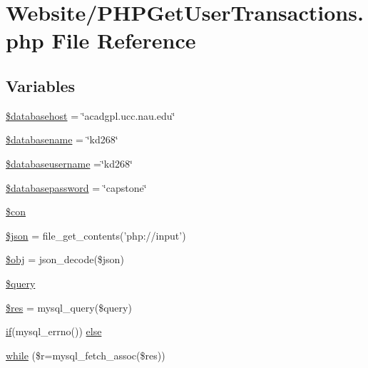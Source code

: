 \hypertarget{_p_h_p_get_user_transactions_8php}{\section{Website/\-P\-H\-P\-Get\-User\-Transactions.php File Reference}
\label{_p_h_p_get_user_transactions_8php}
}
\subsection*{Variables}
\begin{DoxyCompactItemize}
\item 
\hyperlink{_p_h_p_get_user_transactions_8php_a034ead57b6864a4413371711e8d65372}{\$databasehost} = \char`\"{}acadgpl.\-ucc.\-nau.\-edu\char`\"{}
\item 
\hyperlink{_p_h_p_get_user_transactions_8php_aace53f8afce81b52040cef0cd850138a}{\$databasename} = \char`\"{}kd268\char`\"{}
\item 
\hyperlink{_p_h_p_get_user_transactions_8php_a251bf75f510d7c8b556c65d7c30e911f}{\$databaseusername} =\char`\"{}kd268\char`\"{}
\item 
\hyperlink{_p_h_p_get_user_transactions_8php_a1a07536b6a5f43f2d8f826bd2ee6c91a}{\$databasepassword} = \char`\"{}capstone\char`\"{}
\item 
\hyperlink{_p_h_p_get_user_transactions_8php_a0debe10448ec56a57b5509648408a549}{\$con}
\item 
\hyperlink{_p_h_p_get_user_transactions_8php_acedd13b51401130848ce18f4d5c52605}{\$json} = file\-\_\-get\-\_\-contents('php\-://input')
\item 
\hyperlink{_p_h_p_get_user_transactions_8php_a9008ed94ba185855b1723e367744b87e}{\$obj} = json\-\_\-decode(\$json)
\item 
\hyperlink{_p_h_p_get_user_transactions_8php_af59a5f7cd609e592c41dc3643efd3c98}{\$query}
\item 
\hyperlink{_p_h_p_get_user_transactions_8php_a49a8a4009b02e49717caa88b128affc5}{\$res} = mysql\-\_\-query(\$query)
\item 
\hyperlink{_m_c_mhome_page_8php_a8dec719c1645067d1065f7f064d4b967}{if}(mysql\-\_\-errno()) \hyperlink{_p_h_p_get_user_transactions_8php_acd5fe7f2086f786c96623b819503b734}{else}
\item 
\hyperlink{_p_h_p_get_user_transactions_8php_a13a796604f93a68cd06c9010c6a6d0e5}{while} (\$r=mysql\-\_\-fetch\-\_\-assoc(\$res))
\end{DoxyCompactItemize}



